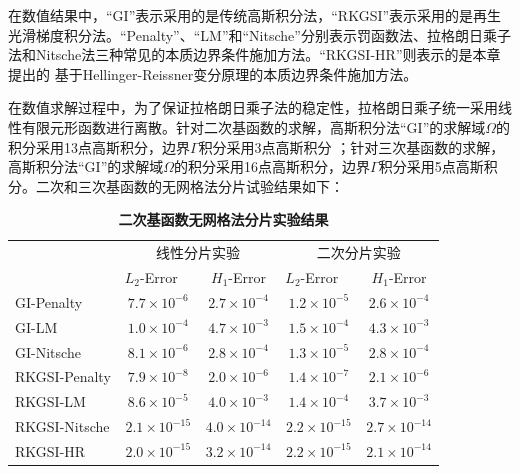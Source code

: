 在数值结果中，“GI”表示采用的是传统高斯积分法，“RKGSI”表示采用的是再生光滑梯度积分法。“Penalty”、“LM”和“Nitsche”分别表示罚函数法、拉格朗日乘子法和Nitsche法三种常见的本质边界条件施加方法。“RKGSI-HR”则表示的是本章提出的
基于Hellinger-Reissner变分原理的本质边界条件施加方法。\par
在数值求解过程中，为了保证拉格朗日乘子法的稳定性，拉格朗日乘子统一采用线性有限元形函数进行离散。针对二次基函数的求解，高斯积分法“GI”的求解域$\Omega$的积分采用13点高斯积分，边界$\Gamma$积分采用3点高斯积分
；针对三次基函数的求解，高斯积分法“GI”的求解域$\Omega$的积分采用16点高斯积分，边界$\Gamma$积分采用5点高斯积分。二次和三次基函数的无网格法分片试验结果如下：\par
\begin{table}[H]
\caption{\textbf{二次基函数无网格法分片实验结果}}
\centering
\begin{tabular}{lcccc}
   \toprule
& \multicolumn{2}{c}{线性分片实验} & \multicolumn{2}{c}{二次分片实验} \\ \cline{2-5}
   &$L_2$-Error$\quad$&$H_1$-Error&$L_2$-Error$\quad$&$H_1$-Error\\
   \midrule
   GI-Penalty&$7.7\times10^{-6}$&$2.7\times10^{-4}$&$1.2\times10^{-5}$&$2.6\times10^{-4}$\\
   GI-LM&$1.0\times10^{-4}$&$4.7\times10^{-3}$&$1.5\times10^{-4}$&$4.3\times10^{-3}$\\
   GI-Nitsche&$8.1\times10^{-6}$&$2.8\times10^{-4}$&$1.3\times10^{-5}$&$2.8\times10^{-4}$\\
  RKGSI-Penalty&$7.9\times10^{-8}$&$2.0\times10^{-6}$&$1.4\times10^{-7}$&$2.1\times10^{-6}$\\
  RKGSI-LM&$8.6\times10^{-5}$&$4.0\times10^{-3}$&$1.4\times10^{-4}$&$3.7\times10^{-3}$\\
  RKGSI-Nitsche&$2.1\times10^{-15}$&$4.0\times10^{-14}$&$2.2\times10^{-15}$&$2.7\times10^{-14}$\\
  RKGSI-HR&$2.0\times10^{-15}$&$3.2\times10^{-14}$&$2.2\times10^{-15}$&$2.1\times10^{-14}$\\
\bottomrule
\end{tabular}
\end{table}

